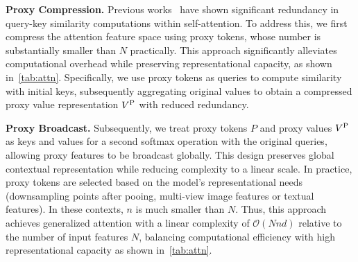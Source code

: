 \noindent \textbf{Proxy Compression.}
Previous works~\cite{han2023agent,pu2024efficient} have shown significant redundancy in query-key similarity computations within self-attention. To address this, we first compress the attention feature space using proxy tokens, whose number is substantially smaller than \(N\) practically. This approach significantly alleviates computational overhead while preserving representational capacity, as shown in~\cref{tab:attn}. Specifically, we use proxy tokens as queries to compute similarity with initial keys, subsequently aggregating original values to obtain a compressed proxy value representation \(V^{\rm P}\) with reduced redundancy.

\noindent \textbf{Proxy Broadcast.}
Subsequently, we treat proxy tokens \(P\) and proxy values \(V^{\rm P}\) as keys and values for a second softmax operation with the original queries, allowing proxy features to be broadcast globally. This design preserves global contextual representation while reducing complexity to a linear scale. In practice, proxy tokens are selected based on the model's representational needs (\eg  downsampling points after pooing, multi-view image features or textual features). In these contexts, \(n\) is much smaller than \(N\). Thus, this approach achieves generalized attention with a linear complexity of $\mathcal{O}(Nnd)$ relative to the number of input features $N$, balancing computational efficiency with high representational capacity as shown in~\cref{tab:attn}.

